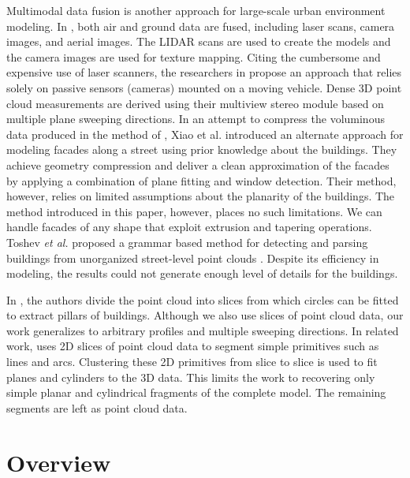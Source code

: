\documentclass[10pt, conference, compsocconf]{IEEEtran}
\begin{document}
Multimodal data fusion is another approach for large-scale urban
environment modeling.
In \cite{UM_Zakhor}, both air and ground data are fused, including
laser scans, camera images, and aerial images.
The LIDAR scans are used to create the models and the camera images are used
for texture mapping.
Citing the cumbersome and expensive use of laser scanners, the researchers
in \cite{AKBARZADEH06} propose an approach that relies solely on passive
sensors (cameras) mounted on a moving vehicle.
Dense 3D point cloud measurements are derived using their multiview stereo
module based on multiple plane sweeping directions.
In an attempt to compress the voluminous data produced in the method of
\cite{AKBARZADEH06}, Xiao et al. \cite{UM_XFTQ} introduced an alternate
approach for modeling facades along a street using prior knowledge about
the buildings.
They achieve geometry compression and deliver a clean approximation of the
facades by applying a combination of plane fitting and window detection.
Their method, however, relies on limited assumptions about the planarity of
the buildings.
The method introduced in this paper, however, places no such limitations.
We can handle facades of any shape that exploit extrusion and tapering operations.
Toshev {\it et al.} proposed a grammar based method for detecting and parsing
buildings from unorganized street-level point clouds \cite{RW_TMT} .
Despite its efficiency in modeling, the results could not generate
enough level of details for the buildings.

In \cite{luo08}, the authors divide the point cloud into slices from which
circles can be fitted to extract pillars of buildings.
Although we also use slices of point cloud data, our work generalizes to
arbitrary profiles and multiple sweeping directions.
In related work, \cite{gonzalvez07} uses 2D slices of point cloud data
to segment simple primitives such as lines and arcs.
Clustering these 2D primitives from slice to slice is used to fit
planes and cylinders to the 3D data.
This limits the work to recovering only simple planar and cylindrical fragments
of the complete model.
The remaining segments are left as point cloud data.

\section{Overview}
\end{document}
